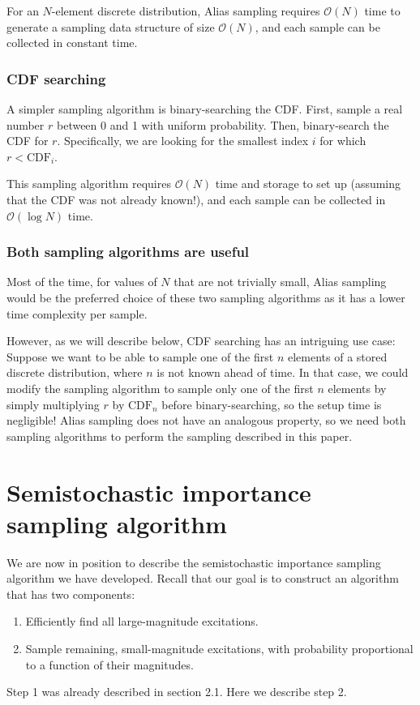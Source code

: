 \documentclass[english]{article}
\begin{document}
For an $N$-element discrete distribution, Alias sampling requires $\mathcal{O}(N)$ time to generate a sampling data structure of size $\mathcal{O}(N)$, and each sample can be collected in constant time.

\subsubsection{CDF searching}
A simpler sampling algorithm is binary-searching the CDF. First, sample a real number $r$ between 0 and 1 with uniform probability. Then, binary-search the CDF for $r$. Specifically, we are looking for the smallest index $i$ for which $r<\textrm{CDF}_i$.

This sampling algorithm requires $\mathcal{O}(N)$ time and storage to set up (assuming that the CDF was not already known!), and each sample can be collected in $\mathcal{O}(\log N)$ time.

\subsubsection{Both sampling algorithms are useful}
Most of the time, for values of $N$ that are not trivially small, Alias sampling would be the preferred choice of these two sampling algorithms as it has a lower time complexity per sample.

However, as we will describe below, CDF searching has an intriguing use case: Suppose we want to be able to sample one of the first $n$ elements of a stored discrete distribution, where $n$ is not known ahead of time. In that case, we could modify the sampling algorithm to sample only one of the first $n$ elements by simply multiplying $r$ by $\textrm{CDF}_n$ before binary-searching, so the setup time is negligible! Alias sampling does not have an analogous property, so we need both sampling algorithms to perform the sampling described in this paper.

\section{Semistochastic importance sampling algorithm}
We are now in position to describe the semistochastic importance sampling algorithm we have developed. Recall that our goal is to construct an algorithm that has two components:
\begin{enumerate}
	\item Efficiently find all large-magnitude excitations.
	\item Sample remaining, small-magnitude excitations, with probability proportional to a function of their magnitudes.
\end{enumerate}
Step 1 was already described in section 2.1. Here we describe step 2.
\end{document}
